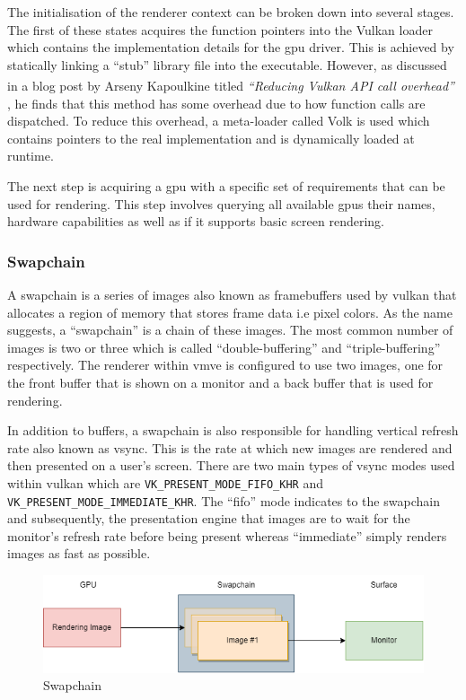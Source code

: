 \documentclass[11pt]{article}
\begin{document}
The initialisation of the renderer context can be broken down into several
stages. The first of these states acquires the function pointers into the Vulkan
loader which contains the implementation details for the \gls*{gpu} driver. This
is achieved by statically linking a ``stub'' library file into the executable.
However, as discussed in a blog post by Arseny Kapoulkine titled
\textit{``Reducing Vulkan\textsuperscript{\textregistered} API call overhead''}
\cite{volk}, he finds that this method has some overhead due to how function
calls are dispatched. To reduce this overhead, a meta-loader called Volk is used
which contains pointers to the real implementation and is dynamically loaded at
runtime.

The next step is acquiring a \gls*{gpu} with a specific set of requirements that
can be used for rendering. This step involves querying all available \glspl*{gpu}
their names, hardware capabilities as well as if it supports basic screen
rendering.

\subsubsection{Swapchain}
A swapchain is a series of images also known as framebuffers used by
\gls*{vulkan} that allocates a region of memory that stores frame data i.e pixel
colors. As the name suggests, a ``swapchain'' is a chain of these images. The
most common number of images is two or three which is called
``double-buffering'' and ``triple-buffering'' respectively. The renderer within
\gls*{vmve} is configured to use two images, one for the front buffer that is shown
on a monitor and a back buffer that is used for rendering.

In addition to buffers, a swapchain is also responsible for handling vertical
refresh rate also known as vsync. This is the rate at which new images are
rendered and then presented on a user's screen. There are two main types of
vsync modes used within \gls*{vulkan} which are
\lstinline{VK_PRESENT_MODE_FIFO_KHR} and
\lstinline{VK_PRESENT_MODE_IMMEDIATE_KHR}. The ``fifo'' mode indicates to the 
swapchain and subsequently, the presentation engine that images are to wait 
for the monitor's refresh rate before being present whereas ``immediate'' simply
renders images as fast as possible.

\begin{figure}[H]
  \centering
  \includegraphics[width=\textwidth]{images/swapchain.png}
  \caption{Swapchain}
  \label{fig:swapchain}
\end{figure}
\end{document}
